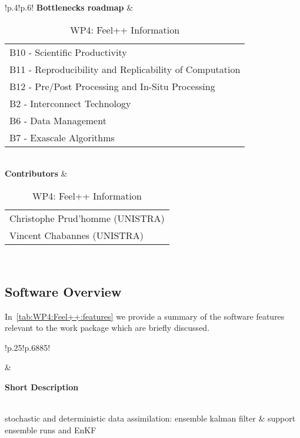 \begin{table}[!ht]
{{\begin{tabular}{!{\color{numpexgray}\vrule}p{.4\textwidth}!{\color{numpexgray}\vrule}p{.6\textwidth}!{\color{numpexgray}\vrule}}
        \textbf{Bottlenecks roadmap} & \begin{tabular}{l}
B10 - Scientific Productivity\\
B11 - Reproducibility and Replicability of Computation\\
B12 - Pre/Post Processing and In-Situ Processing\\
B2 - Interconnect Technology\\
B6 - Data Management\\
B7 - Exascale Algorithms\\
\end{tabular} \\
\textbf{Contributors} & \begin{tabular}{l}
    Christophe Prud'homme (UNISTRA)\\
    Vincent Chabannes (UNISTRA)
    \end{tabular}\\
        \bottomrule
    \end{tabular}
    }}
    \caption{WP4: Feel++ Information}
\end{table}

\subsection{Software Overview}
\label{sec:WP4:Feel++:summary}

In~\cref{tab:WP4:Feel++:features} we provide a summary of the software features relevant to the work package which are briefly discussed.

\begin{table}[!ht]
    \centering
    {
        \setlength{\parindent}{0pt}
        \def\arraystretch{1.25}
        {
            \fontsize{9}{11}\selectfont
            \begin{tabular}{!{\color{numpexgray}\vrule}p{.25\linewidth}!{\color{numpexgray}\vrule}p{.6885\linewidth}!{\color{numpexgray}\vrule}}

     &  {\rule{0pt}{2.5ex}\color{white}\bf Short Description }\\

   stochastic and deterministic data assimilation: ensemble kalman filter & \Feelpp support ensemble runs and EnKF~\cite{asch_data_2016}\\
\end{tabular}
        }
    }
    \caption{WP4: Feel++ Features}
    \label{tab:WP4:Feel++:features}
\end{table}


